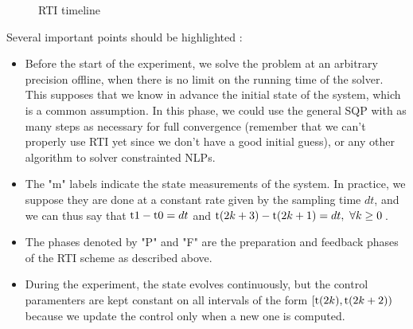\documentclass[12pt]{article}
\begin{document}
\begin{figure}[H]
	\label{fig:RTI-timeline}
	\startchronology[startyear=-3,stopyear=5,startdate=false,dates=false,color=black,width=\textwidth, arrow=true]
	\stopchronology
	\caption{RTI timeline}
\end{figure}

Several important points should be highlighted :
\begin{itemize}[label=\textbullet]
	\item Before the start of the experiment, we solve the problem at an arbitrary precision offline, when there is no limit on the running time of the solver.
	This supposes that we know in advance the initial state of the system, which is a common assumption.
	In this phase, we could use the general SQP with as many steps as necessary for full convergence (remember that we can't properly use RTI yet since we don't have a good initial guess), or any other algorithm to solver constrainted NLPs.

	\item The "\color{green}m\color{black}" labels indicate the state measurements of the system.
	In practice, we suppose they are done at a constant rate given by the sampling time $dt$, and we can thus say that $\rm{t}1-\rm{t}0=dt$ and $\rm{t}(2k+3)-\rm{t}(2k+1)=dt,~\forall k\geq 0$\,.

	\item The phases denoted by "\color{red}P\color{black}" and "\color{blue}F\color{black}" are the preparation and feedback phases of the RTI scheme as described above.

	\item During the experiment, the state evolves continuously, but the control paramenters are kept constant on all intervals of the form $[\rm{t}(2k),\rm{t}(2k+2))$ because we update the control only when a new one is computed.
\end{itemize}
\end{document}
